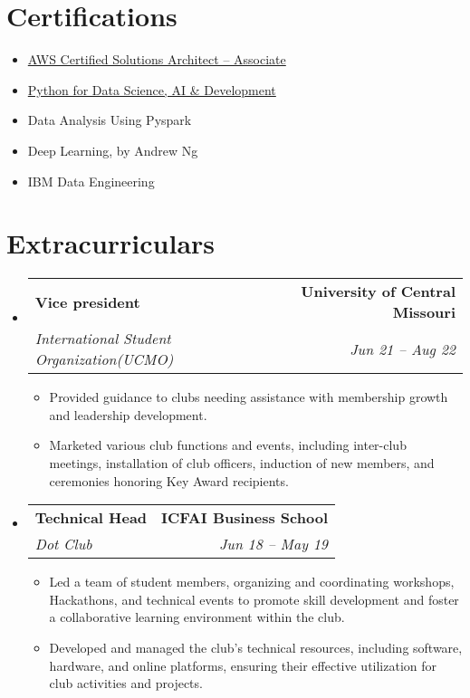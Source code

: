 \documentclass[letterpaper,11pt]{article}
\makeatletter
\newcommand{\resumeItem}[1]{
  \item\small{
    {#1 \vspace{-2pt}}
  }
}
\newcommand{\resumeSubheading}[4]{
  \vspace{-2pt}\item
    \begin{tabular*}{1.0\textwidth}[t]{l@{\extracolsep{\fill}}r}
      \textbf{#1} & \textbf{\small #2} \\
      \textit{\small#3} & \textit{\small #4} \\
    \end{tabular*}\vspace{-7pt}
}
\newcommand{\resumeSubHeadingListStart}{\begin{itemize}[leftmargin=0.0in, label={}]}
\newcommand{\resumeSubHeadingListEnd}{\end{itemize}}
\newcommand{\resumeItemListStart}{\begin{itemize}}
\newcommand{\resumeItemListEnd}{\end{itemize}\vspace{-5pt}}
\makeatother
\begin{document}
\section{Certifications}
\begin{itemize}
    \setlength{\itemsep}{0pt}\setlength{\parskip}{2pt}
    \item \href{https://www.credly.com/badges/45cf8bee-0d91-495d-860f-ab4ef75ceabc/linked_in_profile}{AWS Certified Solutions Architect – Associate}
    \item \href{https://www.coursera.org/account/accomplishments/certificate/GJP8QRA926YB}{Python for Data Science, AI \& Development}
    \item Data Analysis Using Pyspark
    \item Deep Learning, by Andrew Ng
    \item IBM Data Engineering
\end{itemize}

\section{Extracurriculars}
    \resumeSubHeadingListStart
        \resumeSubheading
        {Vice president }{\textnormal{University of Central Missouri}}
                {International Student Organization(UCMO)}{Jun 21 -- Aug 22}
          \vspace{-3pt}
            \resumeItemListStart
                \resumeItem{Provided guidance to clubs needing assistance with membership growth and leadership development.}
                \resumeItem{Marketed various club functions and events, including inter-club meetings, installation of club officers, induction of new members, and ceremonies honoring Key Award recipients.}
\resumeItemListEnd   
        \resumeSubheading
                {Technical Head }{\textnormal{ICFAI Business School}}
        {Dot Club}{Jun 18 -- May 19}
            \resumeItemListStart
                \resumeItem{Led a team of student members, organizing and coordinating workshops, Hackathons, and technical events to promote skill development and foster a collaborative learning environment within the club.}
                \resumeItem{Developed and managed the club's technical resources, including software, hardware, and online platforms, ensuring their effective utilization for club activities and projects.}
    \resumeSubHeadingListEnd
    \resumeSubHeadingListEnd
\end{document}
